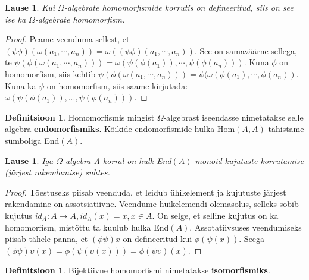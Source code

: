 \documentclass[12pt]{report}
\numberwithin{equation}{section}
\theoremstyle{definition}
\newtheorem{emorf}[equation]{Definitsioon}
\newtheorem{isomorfism}[equation]{Definitsioon}
\theoremstyle{plain}
\newtheorem{homomorfismide_korrutis_homomorfism}[equation]{Lause}
\newtheorem{emorf_on_monoid}[equation]{Lause}
\begin{document}
\begin{homomorfismide_korrutis_homomorfism}
Kui $\Omega$-algebrate homomorfismide korrutis on defineeritud, siis on see ise ka $\Omega$-algebrate homomorfism. 
\end{homomorfismide_korrutis_homomorfism}

\begin{proof}

  Peame veenduma sellest, et $(\psi\phi)(\omega(a_1,\cdots, a_n)) = \omega((\psi \phi)(a_1,\cdots,a_n))$. See on samaväärne sellega, te $\psi(\phi(\omega(a_1,\cdots,a_n))) = \omega(\psi(\phi(a_1)),\cdots, \psi(\phi(a_n)))$. Kuna $\phi$ on homomorfism, siis kehtib $ \psi(\phi(\omega(a_1,\cdots,a_n))) = \psi(\omega(\phi(a_1),\cdots,\phi(a_n))$. Kuna ka $\psi$ on homomorfism, siis saame kirjutada: $\omega(\psi(\phi(a_1)),...,\psi(\phi(a_n)))$.
  

\end{proof}


\begin{emorf}
Homomorfismis mingist $\Omega$-algebrast iseendasse nimetatakse selle algebra \textbf{endomorfismiks}. Kõikide endomorfismide hulka Hom$(A,A)$ tähistame s\"umboliga End$(A)$.
\end{emorf}
 
\begin{emorf_on_monoid}
Iga $\Omega$-algebra A korral on hulk End$(A)$ monoid kujutuste korrutamise (järjest rakendamise) suhtes. 
\end{emorf_on_monoid}

\begin{proof}
Tõestuseks piisab veenduda, et leidub \"uhikelement ja kujutuste järjest rakendamine on assotsiatiivne. Veendume \"huikelemendi olemasolus, selleks sobib kujutus $id_A : A \to A, id_{A}(x) = x, x \in A$. On selge, et selline kujutus on ka homomorfism, mistõttu ta kuulub hulka End$(A)$. Assotatiivsuses veendumiseks piisab tähele panna, et $\left( \phi\psi \right) x$ on defineeritud kui $\phi \left( \psi \left( x \right) \right)$. Seega $\left( \phi \psi \right) \upsilon \left( x \right) = \phi \left( \psi \left( \upsilon \left( x \right) \right) \right) =   \phi \left( \psi \upsilon \right) \left( x \right)$.
\end{proof}

\begin{isomorfism}
Bijektiivne homomorfismi nimetatakse \textbf{isomorfismiks}. 
\end{isomorfism}
\end{document}
